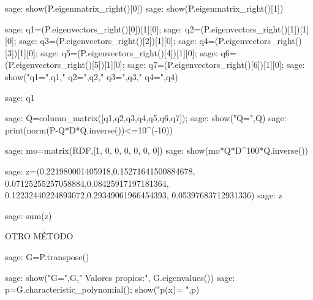\begin{sagecommandline}
    sage: show(P.eigenmatrix_right()[0])
    sage: show(P.eigenmatrix_right()[1])
\end{sagecommandline}
    
\begin{sagecommandline}
    sage: q1=(P.eigenvectors_right()[0])[1][0];
    sage: q2=(P.eigenvectors_right()[1])[1][0];
    sage: q3=(P.eigenvectors_right()[2])[1][0];
    sage: q4=(P.eigenvectors_right()[3])[1][0];
    sage: q5=(P.eigenvectors_right()[4])[1][0];
    sage: q6=(P.eigenvectors_right()[5])[1][0];
    sage: q7=(P.eigenvectors_right()[6])[1][0];
    sage: show("q1=",q1," q2=",q2," q3=",q3," q4=",q4)
\end{sagecommandline}
    
\begin{sagecommandline}
    sage: q1
\end{sagecommandline}
    
\begin{sagecommandline}
    sage: Q=column_matrix([q1,q2,q3,q4,q5,q6,q7]);
    sage: show("Q=",Q)
    sage: print(norm(P-Q*D*Q.inverse())<=10^(-10))
\end{sagecommandline}
    
\begin{sagecommandline}
    sage: mo=matrix(RDF,[1, 0, 0, 0, 0, 0, 0])
    sage: show(mo*Q*D^100*Q.inverse())
\end{sagecommandline}
    
\begin{sagecommandline}
    sage: z=(0.221980001405918,0.15271641500884678, 0.07125255257058884,0.08425917197181364, 0.12232440224893072,0.29349061966454393, 0.05397683712931336)
    sage: z
\end{sagecommandline}
    
\begin{sagecommandline}
    sage: sum(z)
\end{sagecommandline}
    
\par OTRO MÉTODO
    
\begin{sagecommandline}
    sage: G=P.transpose()
\end{sagecommandline}
    
\begin{sagecommandline}
    sage: show("G=",G," Valores propios:", G.eigenvalues())
    sage: p=G.characteristic_polynomial(); show("p(x)=  ",p)
\end{sagecommandline}
    
